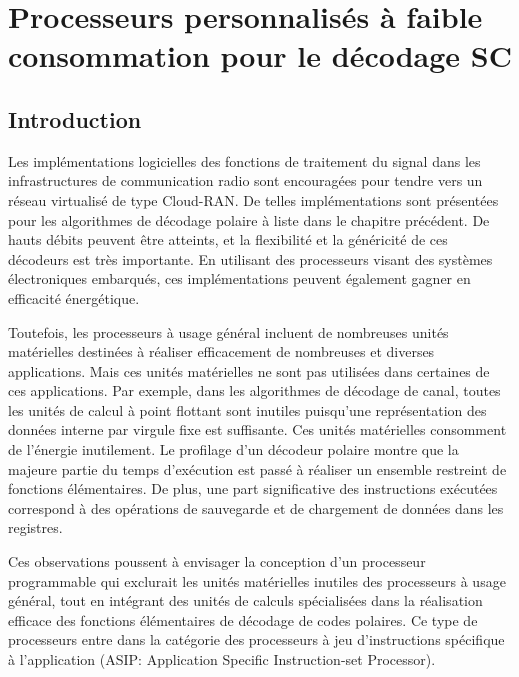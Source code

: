 \chapter{Processeurs personnalisés à faible consommation pour le décodage SC} %
\label{chap:tensilica}

\vspace*{\fill}
\minitocTITI
\vspace*{\fill}
\newpage

\section*{Introduction}
Les implémentations logicielles des fonctions de traitement du signal dans les infrastructures de communication radio sont encouragées pour tendre vers un réseau virtualisé de type Cloud-RAN. De telles implémentations sont présentées pour les algorithmes de décodage polaire à liste dans le chapitre précédent. De hauts débits peuvent être atteints, et la flexibilité et la généricité de ces décodeurs est très importante. En utilisant des processeurs visant des systèmes électroniques embarqués, ces implémentations peuvent également gagner en efficacité énergétique.

Toutefois, les processeurs à usage général incluent de nombreuses unités matérielles destinées à réaliser efficacement de nombreuses et diverses applications. Mais ces unités matérielles ne sont pas utilisées dans certaines de ces applications. Par exemple, dans les algorithmes de décodage de canal, toutes les unités de calcul à point flottant sont inutiles puisqu'une représentation des données interne par virgule fixe est suffisante. Ces unités matérielles consomment de l'énergie inutilement. Le profilage d'un décodeur polaire montre que la majeure partie du temps d'exécution est passé à réaliser un ensemble restreint de fonctions élémentaires. De plus, une part significative des instructions exécutées correspond à des opérations de sauvegarde et de chargement de données dans les registres.

Ces observations poussent à envisager la conception d'un processeur programmable qui exclurait les unités matérielles inutiles des processeurs à usage général, tout en intégrant des unités de calculs spécialisées dans la réalisation efficace des fonctions élémentaires de décodage de codes polaires. Ce type de processeurs entre dans la catégorie des processeurs à jeu d'instructions spécifique à l'application (ASIP: Application Specific Instruction-set Processor).

